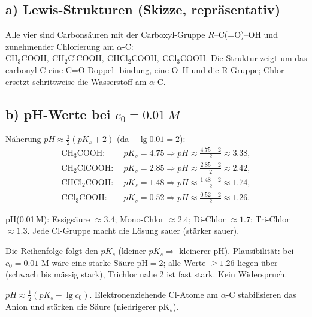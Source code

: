 
\subsection*{a) Lewis-Strukturen (Skizze, repräsentativ)}
Alle vier sind Carbonsäuren mit der Carboxyl-Gruppe
$R$--C(=O)--OH und zunehmender Chlorierung am $\alpha$-C:
$\mathrm{CH_3COOH},\ \mathrm{CH_2ClCOOH},\ \mathrm{CHCl_2COOH},\
\mathrm{CCl_3COOH}$. Die Struktur zeigt um das carbonyl C eine C=O-Doppel-
bindung, eine O--H und die R-Gruppe; Chlor ersetzt schrittweise die
Wasserstoff am $\alpha$-C.

\subsection*{b) pH-Werte bei $c_0=0.01\ M$}
Näherung $pH\approx\frac12(pK_s+2)$ (da $-\lg 0.01=2$):
\begin{align*}
  \mathrm{CH_3COOH{:}\;} & pK_s=4.75
    \Rightarrow pH \approx \frac{4.75+2}{2} \approx 3.38,\\
  \mathrm{CH_2ClCOOH{:}\;} & pK_s=2.85
    \Rightarrow pH \approx \frac{2.85+2}{2} \approx 2.42,\\
  \mathrm{CHCl_2COOH{:}\;} & pK_s=1.48
    \Rightarrow pH \approx \frac{1.48+2}{2} \approx 1.74,\\
  \mathrm{CCl_3COOH{:}\;} & pK_s=0.52
    \Rightarrow pH \approx \frac{0.52+2}{2} \approx 1.26 .
\end{align*}

\begin{ergebnis}
pH(0.01\,M): Essigsäure $\approx3.4$; Mono-Chlor $\approx2.4$; Di-Chlor
$\approx1.7$; Tri-Chlor $\approx1.3$. Jede Cl-Gruppe macht die Lösung
sauer (stärker sauer).
\end{ergebnis}

\begin{kontrolle}
Die Reihenfolge folgt den $pK_s$ (kleiner $pK_s\Rightarrow$ kleinerer pH).
Plausibilität: bei $c_0{=}0.01$ M wäre eine starke Säure pH$=$2; alle Werte
$\geq1.26$ liegen über (schwach bis mässig stark), Trichlor nahe 2 ist fast
stark. Kein Widerspruch.
\end{kontrolle}

\begin{merksatz}
$pH\approx\frac12(pK_s-\lg c_0)$. Elektronenziehende Cl-Atome am
$\alpha$-C stabilisieren das Anion und stärken die Säure (niedrigerer
pK$_s$).
\end{merksatz}
